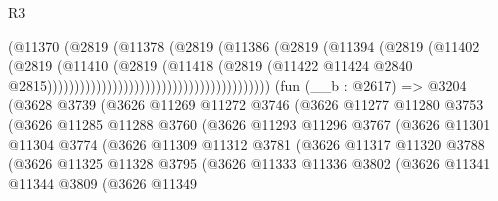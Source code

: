 \begin{lexlean}{R3}
\begin{coremodule}
                                                        (@11370
                                                          (@2819
                                                            (@11378
                                                              (@2819
                                                                (@11386
                                                                  (@2819
                                                                    (@11394
                                                                      (@2819
                                                                        (@11402
                                                                          (@2819
                                                                            (@11410
                                                                              (@2819
                                                                                (@11418
                                                                                  (@2819
                                                                                    (@11422
                                                                                      @11424
                                                                                      @2840
                                                                                      @2815)))))))))))))))))))))))))))))))))))))))))
    (fun (__b : @2617) =>
    @3204
      (@3628
        @3739
        (@3626
          @11269
          @11272
          @3746
          (@3626
            @11277
            @11280
            @3753
            (@3626
              @11285
              @11288
              @3760
              (@3626
                @11293
                @11296
                @3767
                (@3626
                  @11301
                  @11304
                  @3774
                  (@3626
                    @11309
                    @11312
                    @3781
                    (@3626
                      @11317
                      @11320
                      @3788
                      (@3626
                        @11325
                        @11328
                        @3795
                        (@3626
                          @11333
                          @11336
                          @3802
                          (@3626
                            @11341
                            @11344
                            @3809
                            (@3626
                              @11349

\end{coremodule}
\end{lexlean}
